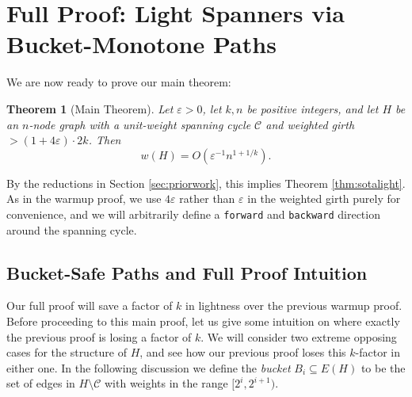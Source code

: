 \documentclass{article}\usepackage[a4paper,margin=20mm]{geometry}
\newtheorem{theorem}{Theorem}\newtheorem{lemma}[theorem]{Lemma}\newtheorem{proposition}[theorem]{Proposition}\newtheorem{corollary}[theorem]{Corollary}\newtheorem{definition}[theorem]{Definition}\newtheorem{claim}[theorem]{Claim}\newtheorem{remark}[theorem]{Remark}\newtheorem{observation}[theorem]{Observation}\newtheorem{conjecture}[theorem]{Conjecture}\newtheorem{example}[theorem]{Example}
\newcommand{\eps}{\varepsilon}
\newcommand{\cee}{\mathcal{C}}
\newcommand{\forward}{\texttt{forward}}
\newcommand{\backward}{\texttt{backward}}
\begin{document}


\section{Full Proof: Light Spanners via Bucket-Monotone Paths \label{sec:mainproof}}

We are now ready to prove our main theorem:


\begin{theorem} [Main Theorem] \label{thm:main}
Let $\eps>0$, let $k, n$ be positive integers, and let $H$ be an $n$-node graph with a unit-weight spanning cycle $\cee$ and weighted girth $>(1+4 \eps) \cdot 2k$.
Then
$$w(H) = O\left( \eps^{-1} n^{1+1/k} \right).$$
\end{theorem}


By the reductions in Section \ref{sec:priorwork}, this implies Theorem \ref{thm:sotalight}.
As in the warmup proof, we use $4\eps$ rather than $\eps$ in the weighted girth purely for convenience, and we will arbitrarily define a \forward{} and \backward{} direction around the spanning cycle.

\subsection{Bucket-Safe Paths and Full Proof Intuition}

Our full proof will save a factor of $k$ in lightness over the previous warmup proof.
Before proceeding to this main proof, let us give some intuition on where exactly the previous proof is losing a factor of $k$.
We will consider two extreme opposing cases for the structure of $H$, and see how our previous proof loses this $k$-factor in either one.
In the following discussion we define the \emph{bucket} $B_i \subseteq E(H)$ to be the set of edges in $H \setminus \cee$ with weights in the range $[2^i, 2^{i+1})$.
\end{document}
